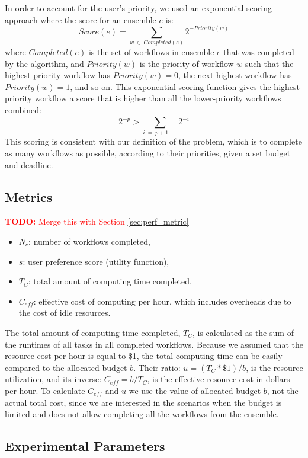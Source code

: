 \documentclass[conference]{IEEEtran}
\newcommand{\TODO}[1]{
  {\Large \textcolor{red}{\textbf{TODO: }#1}}
}
\begin{document}
In order to account for the user's priority, we used an exponential scoring approach where the score for an ensemble $e$ is:
%
$$
Score(e) = \sum_{w~\in~Completed(e)}{2^{-Priority(w)}}
$$
%
where $Completed(e)$ is the set of workflows in ensemble $e$ that was completed by the algorithm, and $Priority(w)$ is the priority of workflow $w$ such that the highest-priority workflow has $Priority(w)=0$, the next highest workflow has $Priority(w)=1$, and so on. This exponential scoring function gives the highest priority workflow a score that is higher than all the lower-priority workflows combined:
%
$$
2^{-p} > \sum_{i~=~p+1,~\ldots}2^{-i}
$$
%
This scoring is consistent with our definition of the problem, which is to complete as many workflows as possible, according to their priorities, given a set budget and deadline.


\subsection{Metrics}

\TODO{Merge this with Section \ref{sec:perf_metric}}

\begin{itemize}
  \item $N_c$: number of workflows completed,
  \item $s$: user preference score (utility function),
  \item $T_C$: total amount of computing time completed,
  \item $C_{eff}$: effective cost of computing per hour, which includes
  overheads due to the cost of idle resources.
\end{itemize}

The total amount of computing time completed, $T_C$, is calculated as the sum 
of the runtimes of all tasks in all completed workflows. Because we assumed 
that the resource cost per hour is equal to \$1, the total computing time 
can be easily compared to the allocated budget $b$. Their ratio: 
$u = (T_C * \$1)/b$, is the resource utilization, and its inverse: 
$C_{eff} = b/T_C$, is the effective resource cost in dollars per hour. To
calculate $C_{eff}$ and $u$ we use the value of allocated budget $b$, not the
actual total cost, since we are interested in the scenarios when the budget is
limited and does not allow completing all the workflows from the ensemble.


\subsection{Experimental Parameters}
\end{document}

